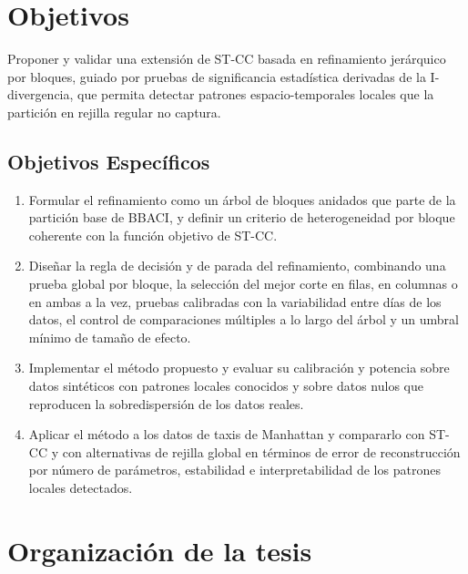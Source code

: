 \section{Objetivos}
\label{sec:objetivos}

Proponer y validar una extensión de \ac{ST-CC} basada en refinamiento
jerárquico por bloques, guiado por pruebas de significancia estadística
derivadas de la I-divergencia, que permita detectar patrones
espacio-temporales locales que la partición en rejilla regular no captura.

\subsection{Objetivos Específicos}
\label{subsec:objetivos-especificos}

\begin{enumerate}
    \item Formular el refinamiento como un árbol de bloques anidados que
          parte de la partición base de \ac{BBACI}, y definir un criterio
          de heterogeneidad por bloque coherente con la función objetivo 
          de \ac{ST-CC}.

    \item Diseñar la regla de decisión y de parada del refinamiento,
          combinando una prueba global por bloque, la selección del mejor
          corte en filas, en columnas o en ambas a la vez, pruebas calibradas
          con la variabilidad entre días de los datos, el control de
          comparaciones múltiples a lo largo del árbol y un umbral mínimo de
          tamaño de efecto.

    \item Implementar el método propuesto y evaluar su calibración y
          potencia sobre datos sintéticos con patrones locales conocidos y
          sobre datos nulos que reproducen la sobredispersión de los datos
          reales.

    \item Aplicar el método a los datos de taxis de Manhattan y compararlo
          con \ac{ST-CC} y con alternativas de rejilla global en términos
          de error de reconstrucción por número de parámetros, estabilidad
          e interpretabilidad de los patrones locales detectados.
\end{enumerate}

\section{Organización de la tesis}
\label{sec:organizacion}

